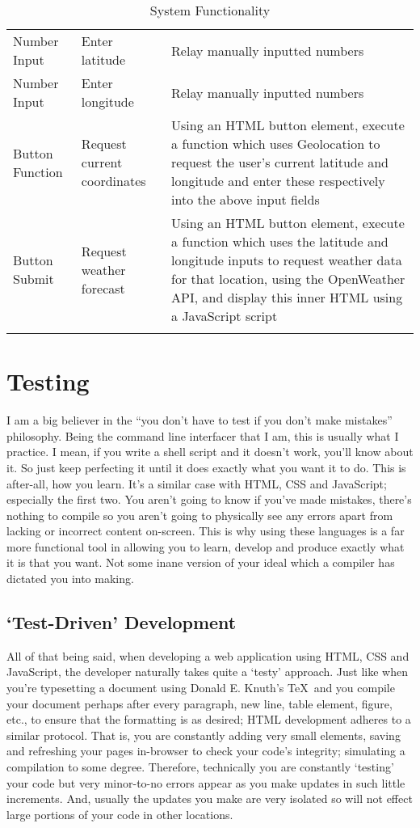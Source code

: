 \documentclass[11pt, english]{article}
\begin{document}
\begin{center}
\begin{longtable}{p{3cm}lp{6cm}}
		Number Input & Enter latitude & Relay manually inputted numbers\\
		Number Input & Enter longitude & Relay manually inputted numbers\\
		Button Function & Request current coordinates & Using an HTML button element, execute a function which uses Geolocation to request the user's current latitude and longitude and enter these respectively into the above input fields\\
		Button Submit & Request weather forecast & Using an HTML button element, execute a function which uses the latitude and longitude inputs to request weather data for that location, using the OpenWeather API, and display this inner HTML using a JavaScript script\\
		\hline
		\caption{System Functionality}
	\end{longtable}
	\end{center}

\newpage

\section{Testing}

	I am a big believer in the ``you don't have to test if you don't make mistakes'' philosophy. Being the command line interfacer that I am, this is usually what I practice. I mean, if you write a shell script and it doesn't work, you'll know about it. So just keep perfecting it until it does exactly what you want it to do. This is after-all, how you learn. It's a similar case with HTML, CSS and JavaScript; especially the first two. You aren't going to know if you've made mistakes, there's nothing to compile so you aren't going to physically see any errors apart from lacking or incorrect content on-screen. This is why using these languages is a far more functional tool in allowing you to learn, develop and produce exactly what it is that you want. Not some inane version of your ideal which a compiler has dictated you into making.

	\subsection{`Test-Driven' Development}

	All of that being said, when developing a web application using HTML, CSS and JavaScript, the developer naturally takes quite a `testy' approach. Just like when you're typesetting a document using Donald E. Knuth's \TeX\ and you compile your document perhaps after every paragraph, new line, table element, figure, etc., to ensure that the formatting is as desired; HTML development adheres to a similar protocol. That is, you are constantly adding very small elements, saving and refreshing your pages in-browser to check your code's integrity; simulating a compilation to some degree. Therefore, technically you are constantly `testing' your code but very minor-to-no errors appear as you make updates in such little increments. And, usually the updates you make are very isolated so will not effect large portions of your code in other locations.\\
\end{document}
